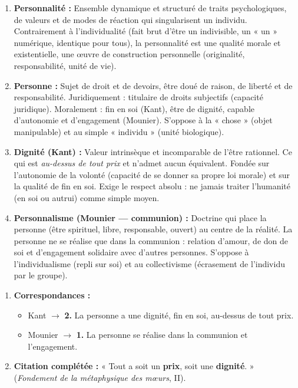 \documentclass[11pt]{article}
\newcommand{\cle}[1]{{\popxbold\color{popdark}#1}}
\begin{document}
\begin{corrige}
\begin{enumerate}
    \item \textbf{Personnalité :} Ensemble dynamique et structuré de traits psychologiques, de valeurs et de modes de réaction qui singularisent un individu. Contrairement à l'\cle{individualité} (fait brut d'être un indivisible, un « un » numérique, identique pour tous), la personnalité est une \cle{qualité} morale et existentielle, une \oe{}uvre de construction personnelle (originalité, responsabilité, unité de vie).
    \item \textbf{Personne :} Sujet de droit et de devoirs, être doué de \cle{raison}, de \cle{liberté} et de \cle{responsabilité}. Juridiquement : titulaire de droits subjectifs (capacité juridique). Moralement : \cle{fin en soi} (Kant), être de dignité, capable d'autonomie et d'engagement (Mounier). S'oppose à la « chose » (objet manipulable) et au simple « individu » (unité biologique).
    \item \textbf{Dignité (Kant) :} \cle{Valeur intrinsèque} et \cle{incomparable} de l'être rationnel. Ce qui est \emph{au-dessus de tout prix} et n'admet \cle{aucun équivalent}. Fondée sur l'\cle{autonomie} de la volonté (capacité de se donner sa propre loi morale) et sur la qualité de \cle{fin en soi}. Exige le respect absolu : ne jamais traiter l'humanité (en soi ou autrui) comme simple moyen.
    \item \textbf{Personnalisme (Mounier — communion) :} Doctrine qui place la \cle{personne} (être spirituel, libre, responsable, ouvert) au centre de la réalité. La personne ne se réalise que dans la \cle{communion} : relation d'\cle{amour}, de \cle{don de soi} et d'\cle{engagement} solidaire avec d'autres personnes. S'oppose à l'individualisme (repli sur soi) et au collectivisme (écrasement de l'individu par le groupe).
\end{enumerate}
\end{corrige}

\begin{corrige}
\begin{enumerate}
    \item \textbf{Correspondances :}
    \begin{itemize}
        \item Kant $\rightarrow$ \textbf{2.} La personne a une dignité, fin en soi, au-dessus de tout prix.
        \item Mounier $\rightarrow$ \textbf{1.} La personne se réalise dans la communion et l'engagement.
    \end{itemize}
    \item \textbf{Citation complétée :} « Tout a soit un \textbf{prix}, soit une \textbf{dignité}. » (\emph{Fondement de la métaphysique des mœurs}, II).
\end{enumerate}
\end{corrige}
\end{document}
